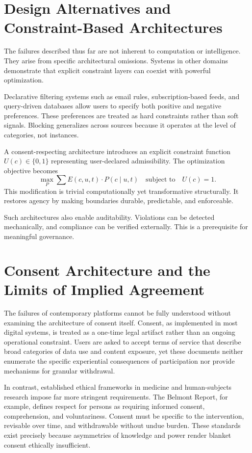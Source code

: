 \documentclass[11pt,oneside]{article}
\begin{document}
\section{Design Alternatives and Constraint-Based Architectures}

The failures described thus far are not inherent to computation or intelligence. They arise from specific architectural omissions. Systems in other domains demonstrate that explicit constraint layers can coexist with powerful optimization.

Declarative filtering systems such as email rules, subscription-based feeds, and query-driven databases allow users to specify both positive and negative preferences. These preferences are treated as hard constraints rather than soft signals. Blocking generalizes across sources because it operates at the level of categories, not instances.

A consent-respecting architecture introduces an explicit constraint function \( U(c) \in \{0,1\} \) representing user-declared admissibility. The optimization objective becomes
\[
\max_{P} \sum E(c,u,t) \cdot P(c \mid u,t)
\quad \text{subject to} \quad U(c) = 1.
\]
This modification is trivial computationally yet transformative structurally. It restores agency by making boundaries durable, predictable, and enforceable.

Such architectures also enable auditability. Violations can be detected mechanically, and compliance can be verified externally. This is a prerequisite for meaningful governance.

\section{Consent Architecture and the Limits of Implied Agreement}

The failures of contemporary platforms cannot be fully understood without examining the architecture of consent itself. Consent, as implemented in most digital systems, is treated as a one-time legal artifact rather than an ongoing operational constraint. Users are asked to accept terms of service that describe broad categories of data use and content exposure, yet these documents neither enumerate the specific experiential consequences of participation nor provide mechanisms for granular withdrawal.

In contrast, established ethical frameworks in medicine and human-subjects research impose far more stringent requirements. The Belmont Report, for example, defines respect for persons as requiring informed consent, comprehension, and voluntariness. Consent must be specific to the intervention, revisable over time, and withdrawable without undue burden. These standards exist precisely because asymmetries of knowledge and power render blanket consent ethically insufficient.
\end{document}
